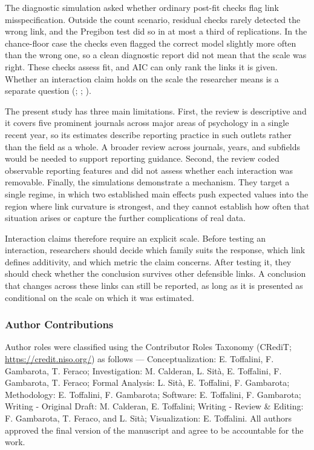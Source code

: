 \documentclass[
  man,
  floatsintext,
  longtable,
  nolmodern,
  notxfonts,
  notimes,
  colorlinks=true,linkcolor=blue,citecolor=blue,urlcolor=blue]{apa7}
\begin{document}
The diagnostic simulation asked whether ordinary post-fit checks flag
link misspecification. Outside the count scenario, residual checks
rarely detected the wrong link, and the Pregibon test did so in at most
a third of replications. In the chance-floor case the checks even
flagged the correct model slightly more often than the wrong one, so a
clean diagnostic report did not mean that the scale was right. These
checks assess fit, and AIC can only rank the links it is given. Whether
an interaction claim holds on the scale the researcher means is a
separate question (; ;
).

The present study has three main limitations. First, the review is
descriptive and it covers five prominent journals across major areas of
psychology in a single recent year, so its estimates describe reporting
practice in such outlets rather than the field as a whole. A broader
review across journals, years, and subfields would be needed to support
reporting guidance. Second, the review coded observable reporting
features and did not assess whether each interaction was removable.
Finally, the simulations demonstrate a mechanism. They target a single
regime, in which two established main effects push expected values into
the region where link curvature is strongest, and they cannot establish
how often that situation arises or capture the further complications of
real data.

Interaction claims therefore require an explicit scale. Before testing
an interaction, researchers should decide which family suits the
response, which link defines additivity, and which metric the claim
concerns. After testing it, they should check whether the conclusion
survives other defensible links. A conclusion that changes across these
links can still be reported, as long as it is presented as conditional
on the scale on which it was estimated.

\subsubsection{Author Contributions}\label{author-contributions}

Author roles were classified using the Contributor Roles Taxonomy
(CRediT; \url{https://credit.niso.org/}) as follows ---
Conceptualization: E. Toffalini, F. Gambarota, T. Feraco; Investigation:
M. Calderan, L. Sità, E. Toffalini, F. Gambarota, T. Feraco; Formal
Analysis: L. Sità, E. Toffalini, F. Gambarota; Methodology: E.
Toffalini, F. Gambarota; Software: E. Toffalini, F. Gambarota; Writing -
Original Draft: M. Calderan, E. Toffalini; Writing - Review \& Editing:
F. Gambarota, T. Feraco, and L. Sità; Visualization: E. Toffalini. All
authors approved the final version of the manuscript and agree to be
accountable for the work.
\end{document}
